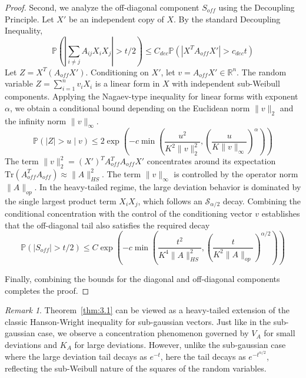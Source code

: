 \documentclass[11pt]{amsart}
\theoremstyle{definition}
\theoremstyle{remark}
\newtheorem*{remark}{Remark}
\begin{document}
\begin{proof}
Second, we analyze the off-diagonal component $S_{off}$ using the Decoupling Principle. Let $X'$ be an independent copy of $X$. By the standard Decoupling Inequality,
\begin{equation}
\mathbb{P}\left( \left| \sum_{i \neq j} A_{ij} X_i X_j \right| > t/2 \right) \le C_{dec} \mathbb{P}\left( \left| X^T A_{off} X' \right| > c_{dec} t \right)
\end{equation}
Let $Z = X^T (A_{off} X')$. Conditioning on $X'$, let $v = A_{off} X' \in \mathbb{R}^n$. The random variable $Z = \sum_{i=1}^n v_i X_i$ is a linear form in $X$ with independent sub-Weibull components. Applying the Nagaev-type inequality for linear forms with exponent $\alpha$, we obtain a conditional bound depending on the Euclidean norm $\|v\|_2$ and the infinity norm $\|v\|_\infty$.
\begin{equation}
\mathbb{P}(|Z| > u \mid v) \le 2 \exp\left( -c \min\left( \frac{u^2}{K^2 \|v\|_2^2}, \left( \frac{u}{K \|v\|_\infty} \right)^\alpha \right) \right)
\end{equation}
The term $\|v\|_2^2 = (X')^T A_{off}^T A_{off} X'$ concentrates around its expectation $\text{Tr}(A_{off}^T A_{off}) \approx \|A\|_{HS}^2$. The term $\|v\|_\infty$ is controlled by the operator norm $\|A\|_{op}$. In the heavy-tailed regime, the large deviation behavior is dominated by the single largest product term $X_i X_j$, which follows an $\mathcal{S}_{\alpha/2}$ decay. Combining the conditional concentration with the control of the conditioning vector $v$ establishes that the off-diagonal tail also satisfies the required decay
\begin{equation}
\mathbb{P}(|S_{off}| > t/2) \le C \exp\left( -c \min\left( \frac{t^2}{K^4 \|A\|_{HS}^2}, \left( \frac{t}{K^2 \|A\|_{op}} \right)^{\alpha/2} \right) \right)
\end{equation}

Finally, combining the bounds for the diagonal and off-diagonal components completes the proof.
\end{proof}

\begin{remark}
Theorem~\ref{thm:3.1} can be viewed as a heavy-tailed extension of the classic Hanson-Wright inequality for sub-gaussian vectors. Just like in the sub-gaussian case, we observe a concentration phenomenon governed by $V_A$ for small deviations and $K_A$ for large deviations. However, unlike the sub-gaussian case where the large deviation tail decays as $e^{-t}$, here the tail decays as $e^{-t^{\alpha/2}}$, reflecting the sub-Weibull nature of the squares of the random variables.
\end{remark}
\end{document}
